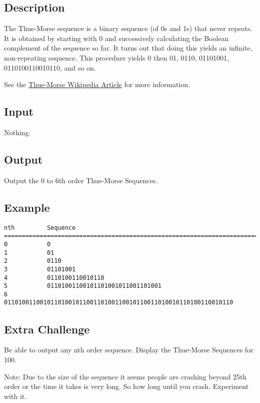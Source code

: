 \subsection*{Description}\label{description-10}

The Thue-Morse sequence is a binary sequence (of 0s and 1s) that never
repeats. It is obtained by starting with 0 and successively calculating
the Boolean complement of the sequence so far. It turns out that doing
this yields an infinite, non-repeating sequence. This procedure yields 0
then 01, 0110, 01101001, 0110100110010110, and so on.

See the
\href{http://en.wikipedia.org/wiki/Thue\%E2\%80\%93Morse_sequence}{Thue-Morse
Wikipedia Article} for more information.

\subsection*{Input}\label{input}

Nothing.

\subsection*{Output}\label{output}

Output the 0 to 6th order Thue-Morse Sequences.

\subsection*{Example}\label{example}

\begin{lstlisting}
nth         Sequence
===========================================================================
0           0
1           01
2           0110
3           01101001
4           0110100110010110
5           01101001100101101001011001101001
6           0110100110010110100101100110100110010110011010010110100110010110
\end{lstlisting}

\subsection*{Extra Challenge}\label{extra-challenge}

Be able to output any nth order sequence. Display the Thue-Morse
Sequences for 100.

Note: Due to the size of the sequence it seems people are crashing
beyond 25th order or the time it takes is very long. So how long until
you crash. Experiment with it.


